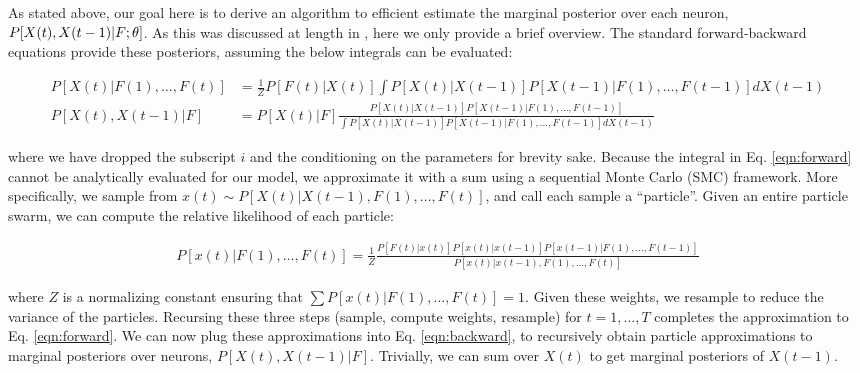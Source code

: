 As stated above, our goal here is to derive an algorithm to efficient estimate the marginal posterior over each neuron, $P[X(t), X(t-1) | F; \mathbf{\theta}]$.  As this was discussed at length in \cite{Vogelstein2009}, here we only provide a brief overview.  The standard forward-backward equations provide these posteriors, assuming the below integrals can be evaluated:

\begin{align}
	P[X(t) | F(1), \ldots, F(t)] &= \frac{1}{Z} P[F(t)| X(t)] \int P[X(t) | X(t-1)] P[X(t-1) | F(1), \ldots, F(t-1)] dX(t-1) \label{eqn:forward} \\
	P[X(t), X(t-1) | F] &= P[X(t) | F] \frac{P[X(t) | X(t-1)] P[X(t-1) | F(1), \ldots, F(t-1)]}{\int P[X(t) | X(t-1)] P[X(t-1) | F(1), \ldots, F(t-1)] dX(t-1)} \label{eqn:backward}
\end{align}

\noindent where we have dropped the subscript $i$ and the conditioning on the parameters for brevity sake.  Because the integral in Eq. \eqref{eqn:forward} cannot be analytically evaluated for our model, we approximate it with a sum using a sequential Monte Carlo (SMC) framework.  More specifically, we sample  from $x(t) \sim P[X(t) | X(t-1), F(1), \ldots, F(t)]$, and call each sample a ``particle''.  Given an entire particle swarm, we can compute the relative likelihood of each particle:

\begin{align}
	P[x(t) | F(1), \ldots, F(t)] = \frac{1}{Z}\frac{P[F(t) | x(t)] P[x(t) | x(t-1)] P[x(t-1) | F(1), \ldots, F(t-1)]} {P[x(t) | x(t-1), F(1), \ldots, F(t)]}
\end{align}

\noindent where $Z$ is a normalizing constant ensuring that $\sum P[x(t) | F(1), \ldots, F(t)]=1$.  Given these weights, we resample to reduce the variance of the particles.  Recursing these three steps (sample, compute weights, resample) for $t=1, \ldots, T$ completes the approximation to Eq. \eqref{eqn:forward}.  We can now plug these approximations into Eq. \eqref{eqn:backward}, to recursively obtain particle approximations to marginal posteriors over neurons, $P[X(t), X(t-1) | F]$.  Trivially, we can sum over $X(t)$ to get marginal posteriors of $X(t-1)$.

